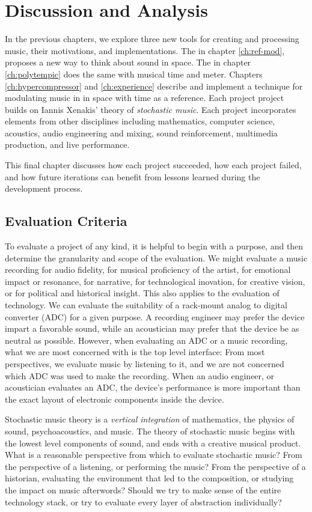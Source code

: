\clearpage
\chapter{Discussion and Analysis}
\label{ch:analysis}
In the previous chapters, we explore three new tools for creating and
processing music, their motivations, and implementations. The 
in chapter \ref{ch:ref-mod}, proposes a new way to think about sound
in space. The \polytempic in chapter \ref{ch:polytempic} does the same
with musical time and meter. Chapters \ref{ch:hypercompressor} and
\ref{ch:experience} describe and implement a technique for modulating
music in in space with time as a reference. Each project project
builds on Iannis Xenakis' theory of \textit{stochastic music}. Each
project incorporates elements from other disciplines including
mathematics, computer science, acoustics, audio engineering and
mixing, sound reinforcement, multimedia production, and live
performance.

This final chapter discusses how each project succeeded, how each
project failed, and how future iterations can benefit from lessons
learned during the development process. 

\section{Evaluation Criteria}
\label{sec:eval-criteria}
To evaluate a project of any kind, it is helpful to begin with a
purpose, and then determine the granularity and scope of the
evaluation.\cite{Saltzer2009} We might evaluate a music recording for
audio fidelity, for musical proficiency of the artist, for emotional
impact or resonance, for narrative, for technological inovation, for
creative vision, or for political and historical insight. This also
applies to the evaluation of technology.  We can evaluate the
suitability of a rack-mount analog to digital converter (ADC) for a
given purpose. A recording engineer may prefer the device impart a
favorable sound, while an acoustician may prefer that the device be
as neutral as possible. However, when evaluating an ADC or a music
recording, what we are most concerned with is the top level interface:
From most perspectives, we evaluate music by listening to it, and we
are not concerned which ADC was used to make the recording. When an
audio engineer, or acoustician evaluates an ADC, the device's
performance is more important than the exact layout of electronic
components inside the device.

Stochastic music theory is a \textit{vertical integration} of
mathematics, the physics of sound, psychoacoustics, and music. The
theory of stochastic music begins with the lowest level components of
sound, and ends with a creative musical product. What is a reasonable
perspective from which to evaluate stochastic music? From the
perspective of a listening, or performing the music? From the
perspective of a historian, evaluating the environment that led to the
composition, or studying the impact on music afterwords?  Should we try
to make sense of the entire technology stack, or try to evaluate every
layer of abstraction individually?

